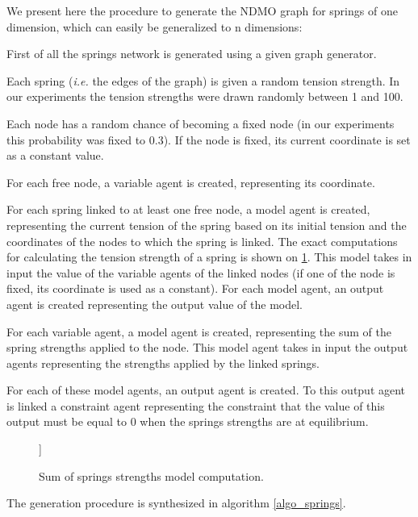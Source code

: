 We present here the procedure to generate the NDMO graph for springs of one dimension, which can easily be generalized to n dimensions:
\begin{compactitem}
\item First of all the springs network is generated using a given graph generator.
\item Each spring (\emph{i.e.} the edges of the graph) is given a random tension strength. In our experiments the tension strengths were drawn randomly between 1 and 100.
\item Each node has a random chance of becoming a fixed node (in our experiments this probability was fixed to 0.3). If the node is fixed, its current coordinate is set as a constant value.
\item For each free node, a variable agent is created, representing its coordinate.
\item For each spring linked to at least one free node, a model agent is created, representing the current tension of the spring based on its initial tension and the coordinates of the nodes to which the spring is linked. The exact computations for calculating the tension strength of a spring is shown on \figurename{} \ref{springs_model}. This model takes in input the value of the variable agents of the linked nodes (if one of the node is fixed, its coordinate is used as a constant). For each model agent, an output agent is created representing the output value of the model.
\item For each variable agent, a model agent is created, representing the sum of the spring strengths applied to the node. This model agent takes in input the output agents representing the strengths applied by the linked springs.
\item For each of these model agents, an output agent is created. To this output agent is linked a constraint agent representing the constraint that the value of this output must be equal to 0 when the springs strengths are at equilibrium.
\end{compactitem}


\begin{figure}
[[TODO - put formula]]
\caption{Sum of springs strengths model computation.}\label{springs_model}
\end{figure}

The generation procedure is synthesized in algorithm \ref{algo_springs}.


